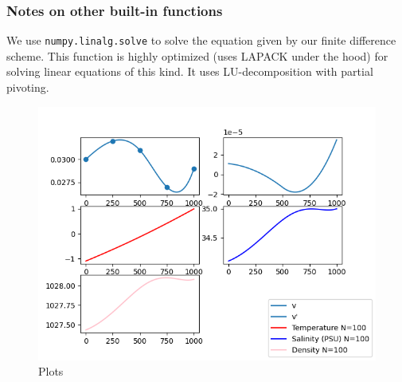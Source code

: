 \documentclass{article}
\begin{document}
\subsubsection*{Notes on other built-in functions}

We use \texttt{numpy.linalg.solve} to solve the equation given by our finite difference scheme. This function is highly optimized (uses LAPACK under the hood) for solving linear equations of this kind. It uses LU-decomposition with partial pivoting.

\begin{figure}[t]
    \includegraphics{../Plots.png}
    \caption{Plots}
\end{figure}
\end{document}
